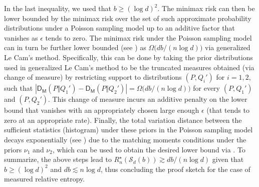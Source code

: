 \documentclass[a4paper,onecolumn,11pt,accepted=2026-05-12]{quantumarticle}
\newcommand{\abs}[1]{\left\vert#1\right\vert}
\newcommand{\sD}{\mathsf{D}}
\newcommand{\cS}{\mathcal{S}}
\begin{document}
In the last inequality, we used that $b \geq  (\log d)^2$. The minimax risk can then be lower bounded by the minimax risk over the set of such approximate probability distributions under a Poisson sampling model up to an additive factor that vanishes as $\epsilon$ tends to zero. The minimax risk under the Poisson sampling model can in turn be further lower bounded  (see \cite[Proof of Lemma 2]{Yihong-Yang-2016}) as $\Omega\big(db/(n\log d)\big)$ via generalized Le Cam's method. Specifically, this can be done by taking the prior distributions used in generalized Le Cam's method to be the truncated measures obtained (via change of measure)  by restricting support to distributions $(P,Q_i')$ for $i=1,2$, such that $\abs{\sD_{\mathsf{M}}(P\Vert Q_1')-\sD_{\mathsf{M}}(P\Vert Q_2')}=\Omega\big(db/(n\log d)\big)$ for every  $(P,Q_1')$ and $(P,Q_2')$. This change of measure incurs an additive penalty on the lower bound that vanishes with an appropriately chosen large enough $\epsilon$ (that tends to zero at an appropriate rate). Finally, the total variation distance between the sufficient statistics (histogram) under these priors in the Poisson sampling model decays exponentially (see \cite[Lemma 3]{Yihong-Yang-2016}) due to the matching moments conditions under the priors $\nu_1$ and $\nu_2$, which can be used to obtain the desired lower bound via \cite[Lemma 2]{Yihong-Yang-2016}. To summarize, the above steps lead to  $R_n^{\star}(\cS_d(b)) \gtrsim d b/(n \log d)$ given that $b \geq (\log d)^2$ and $db \lesssim n \log d$, thus concluding the proof sketch for the case of measured relative entropy. 
\end{document}
